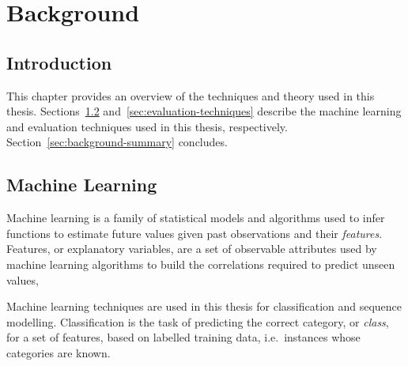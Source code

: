 \chapter{Background}
\label{chap:background}

\section{Introduction}

This chapter provides an overview of the techniques and theory used in this thesis. Sections~\ref{sec:background-machine-learning} and~\ref{sec:evaluation-techniques} describe the machine learning and evaluation techniques used in this thesis, respectively.  Section~\ref{sec:background-summary} concludes.


\section{Machine Learning}
\label{sec:background-machine-learning}

Machine learning is a family of statistical models and algorithms used to infer functions to estimate future values given past observations and their \emph{features}. Features, or explanatory variables, are a set of observable attributes used by machine learning algorithms to build the correlations required to predict unseen values, 

Machine learning techniques are used in this thesis for classification and sequence modelling. Classification is the task of predicting the correct category, or \emph{class}, for a set of features, based on labelled training data, i.e.\ instances whose categories are known.

